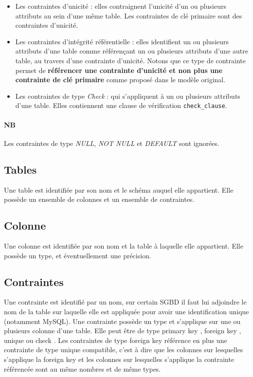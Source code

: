 \begin{itemize}
\item Les contraintes d'unicité : elles contraignent l'unicité d'un ou plusieurs attributs au sein d'une même table. Les contraintes de clé primaire sont des contraintes d'unicité.
\item Les contraintes d'intégrité référentielle : elles identifient un ou plusieurs attributs d'une table comme référençant un ou plusieurs attributs d'une autre table, au travers d'une contrainte d'unicité. Notons que ce type de contrainte permet de \textbf{référencer une contrainte d'unicité et non plus une contrainte de clé primaire} comme proposé dans le modèle original.
\item Les contraintes de type \emph{Check} : qui s'appliquent à un ou plusieurs attributs d'une table. Elles contiennent une clause de vérification \texttt{check\_clause}.
\end{itemize}

\paragraph*{NB}
Les contraintes de type \emph{NULL}, \emph{NOT NULL} et \emph{DEFAULT} sont ignorées.

	\subsection{Tables}
		Une table est identifiée par son nom et le schéma auquel elle appartient. Elle possède un ensemble de colonnes et un ensemble de contraintes.
	\subsection{Colonne}
		Une colonne est identifiée par son nom et la table à laquelle elle appartient. Elle possède un type, et éventuellement une précision. 
	\subsection{Contraintes}
		Une contrainte est identifié par un nom, sur certain SGBD il faut lui adjoindre le nom de la table sur laquelle elle est appliquée pour avoir une identification unique (notamment MySQL). Une contrainte possède un type et s'applique sur une ou plusieurs colonne d'une table. Elle peut être de type \og primary key \fg{}, \og foreign key \fg{}, \og unique \fg{} ou \og check \fg. Les contraintes de type \og foreign key \fg{} référence en plus une contrainte de type unique compatible, c'est à dire que les colonnes sur lesquelles s'applique la \og foreign key \fg{} et les colonnes sur lesquelles s'applique la contrainte référencée sont au même nombres et de même types. 
